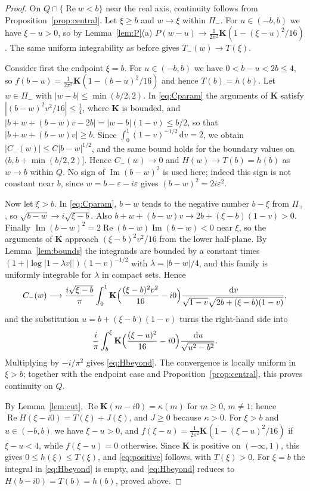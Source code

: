 \documentclass[11pt]{amsart}
\numberwithin{equation}{section}
\theoremstyle{definition}
\theoremstyle{remark}
\newcommand{\Pim}{\Pi_{-}}
\newcommand{\Pip}{\Pi_{+}}
\newcommand{\dd}{\,\mathrm{d}}
\DeclareMathOperator{\re}{Re}
\DeclareMathOperator{\im}{Im}
\newcommand{\Kc}{\mathbf{K}}
\begin{document}
\begin{proof}
On $Q\cap\{\re w<b\}$ near the real axis, continuity follows from
Proposition~\ref{prop:central}. Let $\xi\ge b$ and $w\to \xi$ within $\Pim$. For
$u\in(-b,b)$ we have $\xi-u>0$, so by Lemma~\ref{lem:P}(a)
$P(w-u)\to\frac1{2\pi^2}\Kc(1-(\xi-u)^2/16)$. The same uniform integrability
as before gives $T_-(w)\to T(\xi)$.

Consider first the endpoint $\xi=b$. For $u\in(-b,b)$ we have
$0<b-u<2b\le4$, so $f(b-u)=\frac1{2\pi^2}\Kc(1-(b-u)^2/16)$ and hence
$T(b)=h(b)$. Let $w\in\Pim$ with $|w-b|\le\min(b/2,2)$. In
\eqref{eq:Cparam} the arguments of $\Kc$ satisfy
$|(b-w)^2v^2/16|\le\frac14$, where $\Kc$ is bounded, and
$|b+w+(b-w)v-2b|=|w-b|(1-v)\le b/2$, so that $|b+w+(b-w)v|\ge b$.
Since $\int_0^1(1-v)^{-1/2}\dd v=2$, we obtain
$|C_-(w)|\le C|b-w|^{1/2}$, and the same bound holds for the boundary values
on $(b,b+\min(b/2,2)]$. Hence $C_-(w)\to0$ and $H(w)\to T(b)=h(b)$ as $w\to b$
within $Q$. No sign of $\im(b-w)^2$ is used here; indeed this sign is not
constant near $b$, since $w=b-\varepsilon-i\varepsilon$ gives
$(b-w)^2=2i\varepsilon^2$.

Now let $\xi>b$. In \eqref{eq:Cparam}, $b-w$ tends to the negative number
$b-\xi$ from $\Pip$,
so $\sqrt{b-w}\to i\sqrt{\xi-b}$. Also $b+w+(b-w)v\to2b+(\xi-b)(1-v)>0$. Finally
$\im(b-w)^2=2\re(b-w)\im(b-w)<0$ near $\xi$, so the arguments of $\Kc$ approach
$(\xi-b)^2v^2/16$ from the lower half-plane. By Lemma~\ref{lem:bounds} the
integrands are bounded by a constant times
$(1+|\log|1-\lambda v||)(1-v)^{-1/2}$ with $\lambda=|b-w|/4$, and this family
is uniformly integrable for $\lambda$ in compact sets.
Hence
\[
C_-(w)\longrightarrow\frac{i\sqrt{\xi-b}}{\pi}\int_0^1\Kc\Bigl(\frac{(\xi-b)^2v^2}{16}-i0\Bigr)
\frac{\dd v}{\sqrt{1-v}\sqrt{2b+(\xi-b)(1-v)}} ,
\]
and the substitution $u=b+(\xi-b)(1-v)$ turns the right-hand side into
\[
\frac{i}{\pi}\int_b^\xi\Kc\Bigl(\frac{(\xi-u)^2}{16}-i0\Bigr)\frac{\dd u}{\sqrt{u^2-b^2}} .
\]
Multiplying by $-i/\pi^2$ gives \eqref{eq:Hbeyond}. The convergence is
locally uniform in $\xi>b$; together with the endpoint case and
Proposition~\ref{prop:central}, this proves continuity on $Q$.

By Lemma~\ref{lem:cut}, $\re\Kc(m-i0)=\kappa(m)$ for $m\ge0$, $m\ne1$; hence
$\re H(\xi-i0)=T(\xi)+J(\xi)$, and $J\ge0$ because $\kappa>0$. For $\xi>b$ and
$u\in(-b,b)$ we have $\xi-u>0$, and $f(\xi-u)=\frac1{2\pi^2}\Kc(1-(\xi-u)^2/16)$ if
$\xi-u<4$, while $f(\xi-u)=0$ otherwise. Since $\Kc$ is positive on $(-\infty,1)$,
this gives $0\le h(\xi)\le T(\xi)$, and \eqref{eq:positive} follows, with
$T(\xi)>0$. For $\xi=b$ the integral in \eqref{eq:Hbeyond} is empty, and
\eqref{eq:Hbeyond} reduces to $H(b-i0)=T(b)=h(b)$, proved above.
\end{proof}
\end{document}
